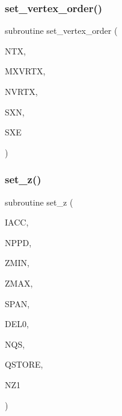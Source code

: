 \mbox{\label{Leroi__c_8f90_a0cb3e794e8c12de92dbc3e157d7991c4}} 
\subsubsection{\texorpdfstring{set\+\_\+vertex\+\_\+order()}{set\_vertex\_order()}}
{\footnotesize\ttfamily subroutine set\+\_\+vertex\+\_\+order (\begin{DoxyParamCaption}\item[{integer}]{N\+TX,  }\item[{integer}]{M\+X\+V\+R\+TX,  }\item[{integer, dimension(ntx)}]{N\+V\+R\+TX,  }\item[{real, dimension (mxvrtx,ntx)}]{S\+XN,  }\item[{real, dimension (mxvrtx,ntx)}]{S\+XE }\end{DoxyParamCaption})}

\mbox{\label{Leroi__c_8f90_aebaab3e30630bc52f3b79ccbc924f89c}} 
\subsubsection{\texorpdfstring{set\+\_\+z()}{set\_z()}}
{\footnotesize\ttfamily subroutine set\+\_\+z (\begin{DoxyParamCaption}\item[{integer}]{I\+A\+CC,  }\item[{integer}]{N\+P\+PD,  }\item[{real}]{Z\+M\+IN,  }\item[{real}]{Z\+M\+AX,  }\item[{real}]{S\+P\+AN,  }\item[{real}]{D\+E\+L0,  }\item[{integer}]{N\+QS,  }\item[{real, dimension(nqs)}]{Q\+S\+T\+O\+RE,  }\item[{integer}]{N\+Z1 }\end{DoxyParamCaption})}

\mbox{\label{Leroi__c_8f90_a044a67601ecbe84bae3971c52173d8c1}} 
